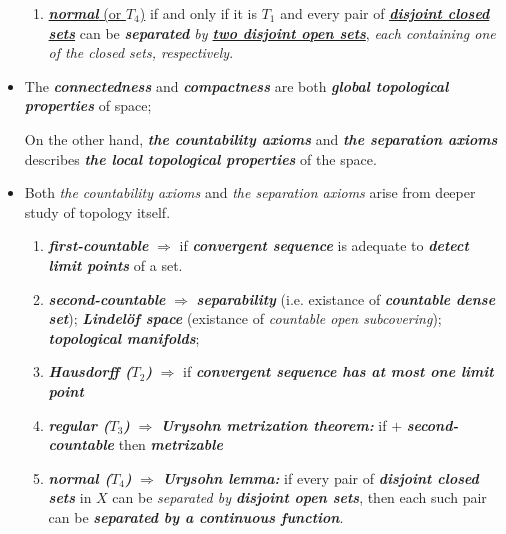 \documentclass[11pt]{article}
\begin{document}
\begin{itemize}
\begin{remark}
\begin{enumerate}
\item \underline{\emph{\textbf{normal}} (or $T_4$)} if and only if it is $T_1$ and every pair of \underline{\emph{\textbf{disjoint closed sets}}} can be  \emph{\textbf{separated} by \textbf{\underline{two disjoint open sets}}}, \emph{each containing one of the closed sets, respectively}.
\end{enumerate}
\end{remark}

\item \begin{remark}
The \emph{\textbf{connectedness}} and \emph{\textbf{compactness}} are both \emph{\textbf{global topological properties}} of space;

On the other hand,  \textit{\textbf{the countability axioms}} and  \emph{\textbf{the separation axioms}} describes \emph{\textbf{the local topological properties}} of the space.
\end{remark}

\item \begin{remark} 
Both \emph{the countability axioms} and \emph{the separation axioms} arise from deeper study of topology itself. 
\begin{enumerate}
\item \textbf{\emph{first-countable}} $\Rightarrow$ if \emph{\textbf{convergent sequence}} is adequate to \emph{\textbf{detect limit points}} of a set.

\item \emph{\textbf{second-countable}} $\Rightarrow$ \emph{\textbf{separability}} (i.e. existance of \emph{\textbf{countable dense set}}); \emph{\textbf{Lindel\"of space}} (existance of \emph{countable open subcovering}); \emph{\textbf{topological manifolds}};

\item \emph{\textbf{Hausdorff ($T_2$)}} $\Rightarrow$ if \emph{\textbf{convergent sequence has at most one limit point}} 

\item \emph{\textbf{regular ($T_3$)}} $\Rightarrow$ \emph{\textbf{Urysohn metrization theorem:}} if $+$ \emph{\textbf{second-countable}} then \emph{\textbf{metrizable}}

\item  \emph{\textbf{normal ($T_4$)}} $\Rightarrow$  \emph{\textbf{Urysohn lemma:}} if every pair of \emph{\textbf{disjoint closed sets}} in $X$ can be
\emph{separated by \textbf{disjoint open sets}}, then each such pair can be \emph{\textbf{separated by a continuous function}}.


\end{enumerate}
\end{remark}
\end{itemize}
\end{document}
